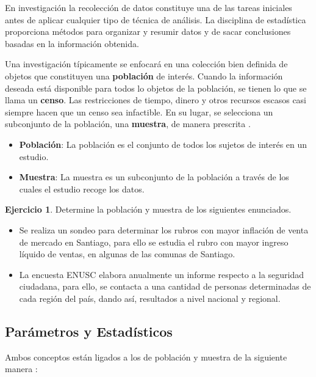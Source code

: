 \documentclass[
  11pt,
]{book}
\providecommand{\tightlist}{%
  \setlength{\itemsep}{0pt}\setlength{\parskip}{0pt}}
\theoremstyle{definition}
\theoremstyle{definition}
\theoremstyle{definition}
\newtheorem{exercise}{Ejercicio}[chapter]
\theoremstyle{definition}
\theoremstyle{remark}
\begin{document}
En investigación la recolección de datos constituye una de las tareas iniciales antes de aplicar cualquier tipo de técnica de análisis. La disciplina de estadística proporciona métodos para organizar y resumir datos y de sacar conclusiones basadas en la información obtenida.

Una investigación típicamente se enfocará en una colección bien definida de objetos que constituyen una \textbf{población} de interés. Cuando la información deseada está disponible para todos lo objetos de la población, se tienen lo que se llama un \textbf{censo}. Las restricciones de tiempo, dinero y otros recursos escasos casi siempre hacen que un censo sea infactible. En su lugar, se selecciona un subconjunto de la población, una \textbf{muestra}, de manera prescrita \citep[página 2]{Devore}.

\begin{itemize}
\tightlist
\item
  \textbf{Población}: La población es el conjunto de todos los sujetos de interés en un estudio.
\item
  \textbf{Muestra}: La muestra es un subconjunto de la población a través de los cuales el estudio recoge los datos.
\end{itemize}

\begin{exercise}
Determine la población y muestra de los siguientes enunciados.
\end{exercise}

\begin{itemize}
\tightlist
\item
  Se realiza un sondeo para determinar los rubros con mayor inflación de venta de mercado en Santiago, para ello se estudia el rubro con mayor ingreso líquido de ventas, en algunas de las comunas de Santiago.
\item
  La encuesta ENUSC elabora anualmente un informe respecto a la seguridad ciudadana, para ello, se contacta a una cantidad de personas determinadas de cada región del país, dando así, resultados a nivel nacional y regional.
\end{itemize}

\subsection{Parámetros y Estadísticos}\label{topicos-conceptos-parametros-estadisticos}

Ambos conceptos están ligados a los de población y muestra de la siguiente manera \citep[página 83]{anderson}:
\end{document}
